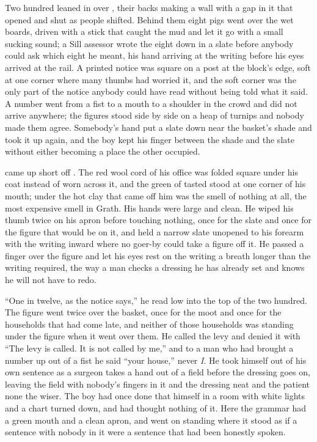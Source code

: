 Two hundred leaned in over , their backs making a wall with a gap in it that opened and shut as people shifted. Behind them eight pigs went over the wet boards, driven with a stick that caught the mud and let it go with a small sucking sound; a Sill assessor wrote the eight down in a slate before anybody could ask which eight he meant, his hand arriving at the writing before his eyes arrived at the rail. A printed notice was square on a post at the block's edge, soft at one corner where many thumbs had worried it, and the soft corner was the only part of the notice anybody could have read without being told what it said. A number went from a fist to a mouth to a shoulder in the crowd and did not arrive anywhere; the figures stood side by side on a heap of turnips and nobody made them agree. Somebody's hand put a slate down near the basket's shade and took it up again, and the boy kept his finger between the shade and the slate without either becoming a place the other occupied.

 came up short off . The red wool cord of his office was folded square under his coat instead of worn across it, and the green of tasted  stood at one corner of his mouth; under the hot clay that came off him was the smell of nothing at all, the most expensive smell in Grath. His hands were large and clean. He wiped his thumb twice on his apron before touching nothing, once for the slate and once for the figure that would be on it, and held a narrow slate unopened to his forearm with the writing inward where no goer-by could take a figure off it. He passed a finger over the figure and let his eyes rest on the writing a breath longer than the writing required, the way a man checks a dressing he has already set and knows he will not have to redo.

“One in twelve, as the notice says,” he read low into the top of the two hundred. The figure went twice over the basket, once for the moot and once for the households that had come late, and neither of those households was standing under the figure when it went over them. He called the levy and denied it with “The levy is called. It is not called by me,” and to a man who had brought a number up out of a fist he said “your house,” never \emph{I}. He took himself out of his own sentence as a surgeon takes a hand out of a field before the dressing goes on, leaving the field with nobody's fingers in it and the dressing neat and the patient none the wiser. The boy had once done that himself in a room with white lights and a chart turned down, and had thought nothing of it. Here the grammar had a green mouth and a clean apron, and went on standing where it stood as if a sentence with nobody in it were a sentence that had been honestly spoken.

